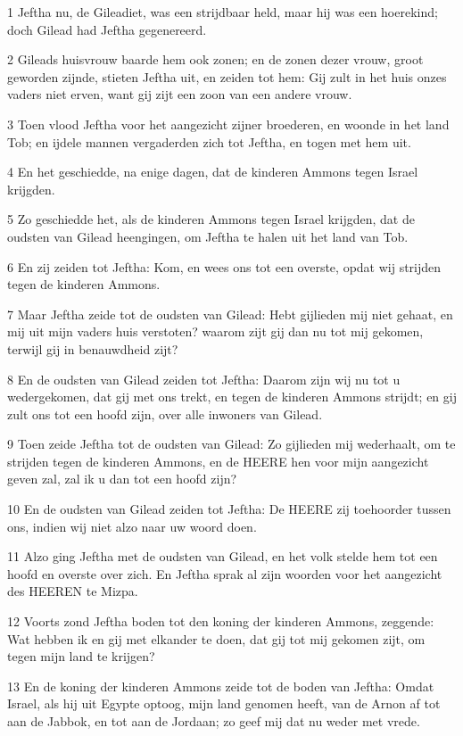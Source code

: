 \par 1 Jeftha nu, de Gileadiet, was een strijdbaar held, maar hij was een hoerekind; doch Gilead had Jeftha gegenereerd.
\par 2 Gileads huisvrouw baarde hem ook zonen; en de zonen dezer vrouw, groot geworden zijnde, stieten Jeftha uit, en zeiden tot hem: Gij zult in het huis onzes vaders niet erven, want gij zijt een zoon van een andere vrouw.
\par 3 Toen vlood Jeftha voor het aangezicht zijner broederen, en woonde in het land Tob; en ijdele mannen vergaderden zich tot Jeftha, en togen met hem uit.
\par 4 En het geschiedde, na enige dagen, dat de kinderen Ammons tegen Israel krijgden.
\par 5 Zo geschiedde het, als de kinderen Ammons tegen Israel krijgden, dat de oudsten van Gilead heengingen, om Jeftha te halen uit het land van Tob.
\par 6 En zij zeiden tot Jeftha: Kom, en wees ons tot een overste, opdat wij strijden tegen de kinderen Ammons.
\par 7 Maar Jeftha zeide tot de oudsten van Gilead: Hebt gijlieden mij niet gehaat, en mij uit mijn vaders huis verstoten? waarom zijt gij dan nu tot mij gekomen, terwijl gij in benauwdheid zijt?
\par 8 En de oudsten van Gilead zeiden tot Jeftha: Daarom zijn wij nu tot u wedergekomen, dat gij met ons trekt, en tegen de kinderen Ammons strijdt; en gij zult ons tot een hoofd zijn, over alle inwoners van Gilead.
\par 9 Toen zeide Jeftha tot de oudsten van Gilead: Zo gijlieden mij wederhaalt, om te strijden tegen de kinderen Ammons, en de HEERE hen voor mijn aangezicht geven zal, zal ik u dan tot een hoofd zijn?
\par 10 En de oudsten van Gilead zeiden tot Jeftha: De HEERE zij toehoorder tussen ons, indien wij niet alzo naar uw woord doen.
\par 11 Alzo ging Jeftha met de oudsten van Gilead, en het volk stelde hem tot een hoofd en overste over zich. En Jeftha sprak al zijn woorden voor het aangezicht des HEEREN te Mizpa.
\par 12 Voorts zond Jeftha boden tot den koning der kinderen Ammons, zeggende: Wat hebben ik en gij met elkander te doen, dat gij tot mij gekomen zijt, om tegen mijn land te krijgen?
\par 13 En de koning der kinderen Ammons zeide tot de boden van Jeftha: Omdat Israel, als hij uit Egypte optoog, mijn land genomen heeft, van de Arnon af tot aan de Jabbok, en tot aan de Jordaan; zo geef mij dat nu weder met vrede.
